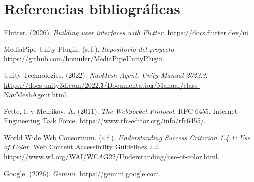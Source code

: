\documentclass[11pt,a4paper]{article}
\begin{document}
\clearpage
\section{Referencias bibliográficas}

\begin{description}[leftmargin=0pt,labelwidth=1.1cm,style=nextline,itemsep=0.75em]
 
  \item[{[R1]}] Flutter. (2026). \textit{Building user interfaces with Flutter}. \url{https://docs.flutter.dev/ui}. 
  \item[{[R2]}] MediaPipe Unity Plugin. (s.\,f.). \textit{Repositorio del proyecto}. \url{https://github.com/homuler/MediaPipeUnityPlugin}. 
  \item[{[R3]}] Unity Technologies. (2022). \textit{NavMesh Agent, Unity Manual 2022.3}. \url{https://docs.unity3d.com/2022.3/Documentation/Manual/class-NavMeshAgent.html}. 
  \item[{[R4]}] Fette, I. y Melnikov, A. (2011). \textit{The WebSocket Protocol}. RFC 6455. Internet Engineering Task Force. \url{https://www.rfc-editor.org/info/rfc6455/}.
  \item[{[R5]}] World Wide Web Consortium. (s.\,f.). \textit{Understanding Success Criterion 1.4.1: Use of Color}. Web Content Accessibility Guidelines 2.2. \url{https://www.w3.org/WAI/WCAG22/Understanding/use-of-color.html}. 
  \item[{[R6]}] Google. (2026). \textit{Gemini}. \url{https://gemini.google.com}.
\end{description}
\end{document}
